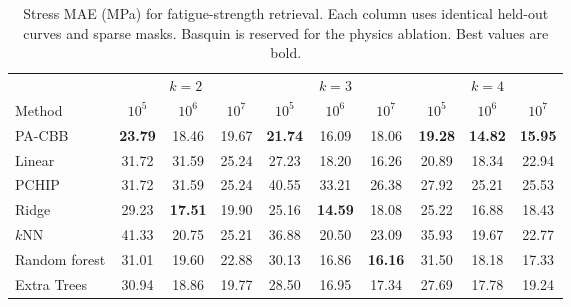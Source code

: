 \begin{table}[t]
\caption{Stress MAE (MPa) for fatigue-strength retrieval. Each column uses identical held-out curves and sparse masks. Basquin is reserved for the physics ablation. Best values are bold.}
\label{tab:downstream_strength_baselines}
\centering
\scriptsize
\setlength{\tabcolsep}{3.2pt}
\begin{tabular}{lccc|ccc|ccc}
\toprule
& \multicolumn{3}{c}{$k=2$} & \multicolumn{3}{c}{$k=3$} & \multicolumn{3}{c}{$k=4$} \\
\cmidrule(lr){2-4}\cmidrule(lr){5-7}\cmidrule(lr){8-10}
Method & $10^5$ & $10^6$ & $10^7$ & $10^5$ & $10^6$ & $10^7$ & $10^5$ & $10^6$ & $10^7$ \\
\midrule
PA-CBB & \textbf{23.79} & 18.46 & 19.67 & \textbf{21.74} & 16.09 & 18.06 & \textbf{19.28} & \textbf{14.82} & \textbf{15.95} \\
Linear & 31.72 & 31.59 & 25.24 & 27.23 & 18.20 & 16.26 & 20.89 & 18.34 & 22.94 \\
PCHIP & 31.72 & 31.59 & 25.24 & 40.55 & 33.21 & 26.38 & 27.92 & 25.21 & 25.53 \\
Ridge & 29.23 & \textbf{17.51} & 19.90 & 25.16 & \textbf{14.59} & 18.08 & 25.22 & 16.88 & 18.43 \\
$k$NN & 41.33 & 20.75 & 25.21 & 36.88 & 20.50 & 23.09 & 35.93 & 19.67 & 22.77 \\
Random forest & 31.01 & 19.60 & 22.88 & 30.13 & 16.86 & \textbf{16.16} & 31.50 & 18.18 & 17.33 \\
Extra Trees & 30.94 & 18.86 & 19.77 & 28.50 & 16.95 & 17.34 & 27.69 & 17.78 & 19.24 \\
\bottomrule
\end{tabular}
\end{table}
